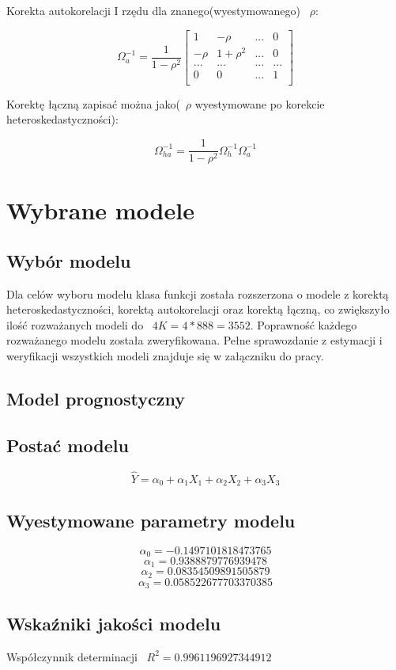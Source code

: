 \documentclass{article}
\begin{document}
Korekta autokorelacji I rzędu dla znanego(wyestymowanego) ~$\rho$:

\begin{equation*}
    \Omega_{a}^{-1}=\frac{1}{1-\rho^2}
    \begin{bmatrix}
        1 & -\rho & ... & 0 \\
        -\rho & 1 + \rho^2 & ... & 0 \\
        ... & ... & ... & ... \\
        0 & 0 & ... & 1 \\
    \end{bmatrix}
\end{equation*}

Korektę łączną zapisać można jako(~$\rho$ wyestymowane po korekcie heteroskedastyczności):

\[\Omega_{ha}^{-1}=\frac{1}{1-\rho^2}\Omega_h^{-1}\Omega_a^{-1}\]

\newpage
\section{Wybrane modele}
\subsection{Wybór modelu}
Dla celów wyboru modelu klasa funkcji została rozszerzona o modele z korektą heteroskedastyczności, korektą autokorelacji oraz korektą łączną, co zwiększyło ilość rozważanych modeli do ~$4K=4*888=3552$. Poprawność każdego rozważanego modelu została zweryfikowana. Pełne sprawozdanie z estymacji i weryfikacji wszystkich modeli znajduje się w załączniku do pracy.

\subsection{Model prognostyczny}
\subsection{Postać modelu}
\[ \hat{Y} = \alpha_0 + \alpha_1X_1 + \alpha_2X_2 + \alpha_3X_3\]\subsection{Wyestymowane parametry modelu}
\[\alpha_0 = -0.1497101818473765\]
\[\alpha_1 = 0.9388879776939478\]
\[\alpha_2 = 0.08354509891505879\]
\[\alpha_3 = 0.058522677703370385\]
\subsection{Wskaźniki jakości modelu}
Współczynnik determinacji ~$R^2 = 0.9961196927344912$
\end{document}
